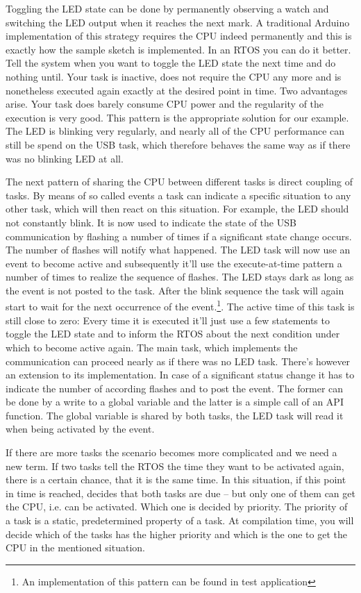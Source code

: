 Toggling the LED state can be done by permanently observing a watch and
switching the LED output when it reaches the next mark. A traditional
Arduino implementation of this strategy requires the CPU indeed
permanently and this is exactly how the sample sketch  is
implemented. In an RTOS you can do it better. Tell the system when you
want to toggle the LED state the next time and do nothing until. Your task
is inactive, does not require the CPU any more and is nonetheless executed
again exactly at the desired point in time. Two advantages arise. Your
task does barely consume CPU power and the regularity of the execution is
very good. This pattern is the appropriate solution for our example. The
LED is blinking very regularly, and nearly all of the CPU performance can
still be spend on the USB task, which therefore behaves the same way as if
there was no blinking LED at all.

The next pattern of sharing the CPU between different tasks is direct
coupling of tasks. By means of so called events a task can indicate a
specific situation to any other task, which will then react on this
situation. For example, the LED should not constantly blink. It is now
used to indicate the state of the USB communication by flashing a number
of times if a significant state change occurs. The number of flashes will
notify what happened. The LED task will now use an event to become active
and subsequently it'll use the execute-at-time pattern a number of times
to realize the sequence of flashes. The LED stays dark as long as the
event is not posted to the task. After the blink sequence the task will
again start to wait for the next occurrence of the event.\footnote{An
implementation of this pattern can be found in test application
}. The active time of this task is still close to zero: Every
time it is executed it'll just use a few statements to toggle the LED
state and to inform the RTOS about the next condition under which to
become active again. The main task, which implements the communication can
proceed nearly as if there was no LED task. There's however an extension
to its implementation. In case of a significant status change it has to
indicate the number of according flashes and to post the event. The former
can be done by a write to a global variable and the latter is a simple
call of an \rtos{} API function. The global variable is shared by both
tasks, the LED task will read it when being activated by the event.

If there are more tasks the scenario becomes more complicated and we need
a new term. If two tasks tell the RTOS the time they want to be activated
again, there is a certain chance, that it is the same time. In this
situation, if this point in time is reached, \rtos{} decides that both
tasks are due -- but only one of them can get the CPU, i.e. can be
activated. Which one is decided by priority. The priority of a task is a
static, predetermined property of a task. At compilation time, you will
decide which of the tasks has the higher priority and which is the one to
get the CPU in the mentioned situation.

